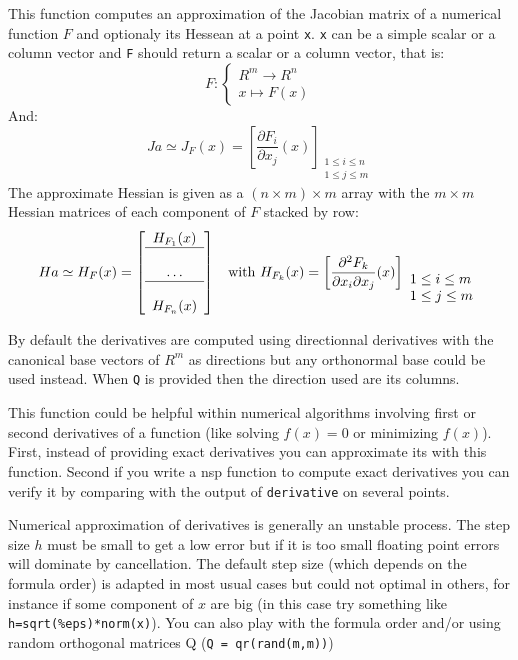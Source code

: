 \begin{mandescription}

This function computes an approximation of the Jacobian matrix of a numerical
function $F$ and optionaly its Hessean at a point \verb+x+. \verb+x+
can be a simple scalar or a column vector and \verb+F+ should return a 
scalar or a column vector, that is: 
$$
    F: \left\{\begin{array}{l} R^m \rightarrow R^n  \\ 
                               x \longmapsto F(x) 
              \end{array} \right.
$$
And:
$$
    Ja \simeq J_F(x) = \left[ \frac{\partial F_i}{\partial x_j}(x)  
                      \right]_{\begin{array}{l}1 \le i \le n\\1\le j
                          \le m \end{array}}
$$
The approximate Hessian is given as a $(n \times m) \times m$ array
with the $m \times m$ Hessian matrices of each component of $F$
stacked by row:
$$
   Ha  \simeq H_F(x) = \left[ \begin{array}{c} H_{F_1}(x) \\ \hline \\ \dots
     \\ \hline \\  H_{F_n}(x) \end{array} \right] \;\; \mbox{ with }
   H_{F_k}(x) =  \left[  \frac{\partial^2 F_k}{\partial x_i \partial x_j}(x)   
                \right]_{\begin{array}{l}1 \le i \le m\\1\le j
                          \le m \end{array}}
$$

By default the derivatives are computed using directionnal derivatives
with the canonical base vectors of $R^m$ as directions
but any orthonormal base could be used instead. When \verb+Q+ is
provided then the direction used are its columns.

This function could be helpful within numerical algorithms involving
first or second derivatives of a function (like solving $f(x)=0$
or minimizing $f(x)$). First, instead of providing exact derivatives
you can approximate its with this function. Second if you write a
nsp function to compute exact derivatives you can verify it
by comparing with the output of \verb+derivative+ on several points.

Numerical approximation of derivatives is generally an unstable process.  
The step size $h$ must be small to get a low error but if it is too small floating  
point errors will dominate by cancellation. The default step size
(which depends on the formula order) is adapted in most usual cases 
but could not optimal in others, for instance if some component of $x$
are big (in this case try something like \verb+h=sqrt(%eps)*norm(x)+). 
You can also play with the formula order and/or
using random orthogonal matrices Q (\verb+Q = qr(rand(m,m))+)


\end{mandescription}
